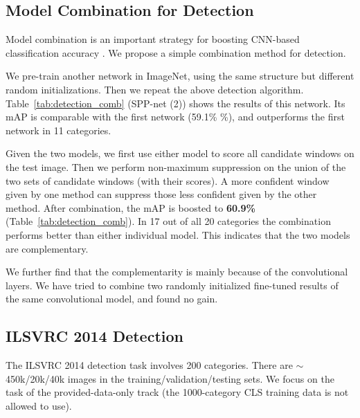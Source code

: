 \documentclass[10pt,journal,cspaper,compsoc]{IEEEtran}
\begin{document}
\subsection{Model Combination for Detection}

Model combination is an important strategy for boosting CNN-based classification accuracy \cite{Krizhevsky2012}. We propose a simple combination method for detection.

We pre-train another network in ImageNet, using the same structure but different random initializations. Then we repeat the above detection algorithm. Table~\ref{tab:detection_comb} (SPP-net (2)) shows the results of this network. Its mAP is comparable with the first network (59.1\% \%), and outperforms the first network in 11 categories.

Given the two models, we first use either model to score all candidate windows on the test image.
Then we perform non-maximum suppression on the union of the two sets of candidate windows (with their scores).
A more confident window given by one method can suppress those less confident given by the other method. After combination, the mAP is boosted to \textbf{60.9\%} (Table~\ref{tab:detection_comb}). In 17 out of all 20 categories the combination performs better than either individual model. This indicates that the two models are complementary.

We further find that the complementarity is mainly because of the convolutional layers. We have tried to combine two randomly initialized fine-tuned results of the same convolutional model, and found no gain.

\subsection{ILSVRC 2014 Detection}

The ILSVRC 2014 detection \cite{Russakovsky2014} task involves 200 categories. There are $\sim$450k/20k/40k images in the training/validation/testing sets. We focus on the task of the provided-data-only track (the 1000-category CLS training data is not allowed to use).
\end{document}
